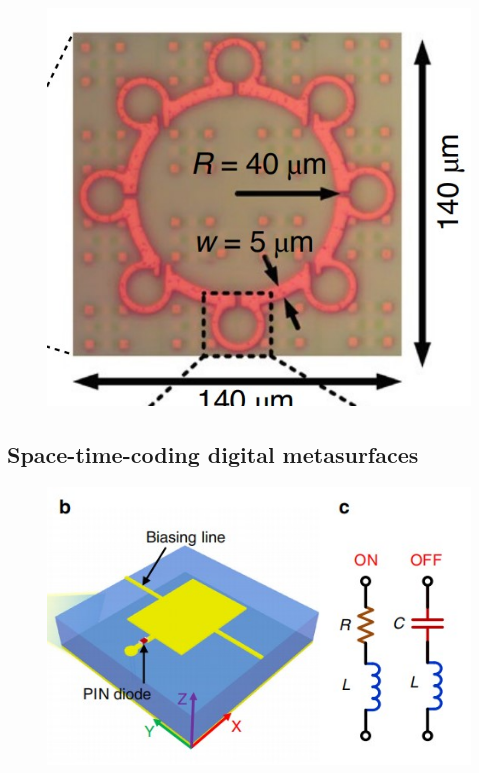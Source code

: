 \documentclass[]{article}
\begin{document}
	\begin{figure}[H]
		\centering
		\includegraphics[scale=0.65]{Fig/18.jpg}
	\end{figure}


	\subsection*{Space-time-coding digital metasurfaces}
	\begin{figure}[H]
		\centering
		\includegraphics[scale=0.8]{Fig/19.jpg}
	\end{figure}
\end{document}
